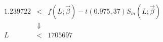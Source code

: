 

\begin{eqnarray*}
1.239722 & < & f(L;\vec{\beta}) - t(0.975,37)S_m(L;\vec{\beta}) \\
         &   \Downarrow & \\
      L  & < & 1705697
\end{eqnarray*}


